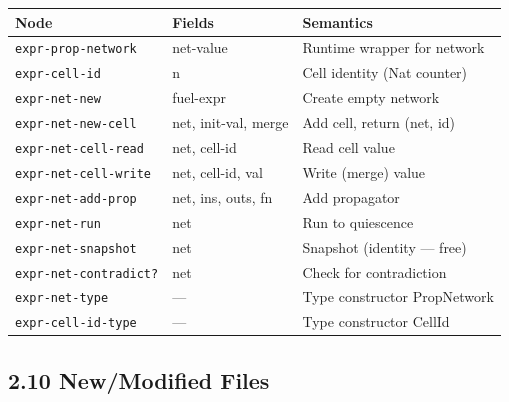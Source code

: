 \documentclass[11pt]{article}
\begin{document}
\begin{center}
\begin{tabular}{lll}
Node & Fields & Semantics\\
\hline
\texttt{expr-prop-network} & net-value & Runtime wrapper for network\\
\texttt{expr-cell-id} & n & Cell identity (Nat counter)\\
\texttt{expr-net-new} & fuel-expr & Create empty network\\
\texttt{expr-net-new-cell} & net, init-val, merge & Add cell, return (net, id)\\
\texttt{expr-net-cell-read} & net, cell-id & Read cell value\\
\texttt{expr-net-cell-write} & net, cell-id, val & Write (merge) value\\
\texttt{expr-net-add-prop} & net, ins, outs, fn & Add propagator\\
\texttt{expr-net-run} & net & Run to quiescence\\
\texttt{expr-net-snapshot} & net & Snapshot (identity — free)\\
\texttt{expr-net-contradict?} & net & Check for contradiction\\
\texttt{expr-net-type} & — & Type constructor PropNetwork\\
\texttt{expr-cell-id-type} & — & Type constructor CellId\\
\end{tabular}
\end{center}
\subsection{2.10 New/Modified Files}
\label{sec:orge56cef1}
\end{document}
